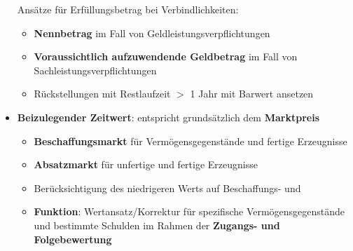 \begin{itemize}
	Ansätze für Erfüllungsbetrag bei Verbindlichkeiten:
	\begin{itemize}
		\item \textbf{Nennbetrag} im Fall von Geldleistungsverpflichtungen
		\item \textbf{Voraussichtlich aufzuwendende Geldbetrag} im Fall von Sachleistungsverpflichtungen
		\item Rückstellungen mit Restlaufzeit $>$ 1 Jahr mit Barwert ansetzen
	\end{itemize}
	\item \textbf{Beizulegender Zeitwert}: entspricht grundsätzlich dem \textbf{Marktpreis}
	\begin{itemize}
		\item \textbf{Beschaffungsmarkt} für Vermögensgegenstände und fertige Erzeugnisse
		\item \textbf{Absatzmarkt} für unfertige und fertige Erzeugnisse
		\item Berücksichtigung des niedrigeren Werts auf Beschaffungs- und 
		\item \textbf{Funktion}: Wertansatz/Korrektur für spezifische Vermögensgegenstände und bestimmte Schulden im Rahmen der \textbf{Zugangs- und Folgebewertung}
	\end{itemize}
\end{itemize}

